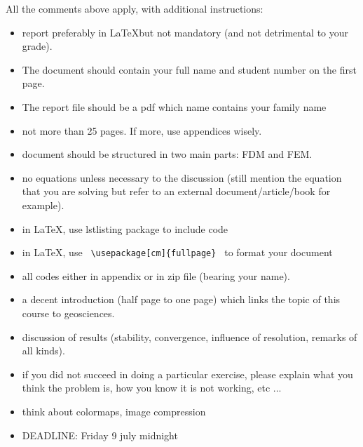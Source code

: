 All the comments above apply, with additional instructions:
\begin{itemize}
\item report preferably in \LaTeX but not mandatory (and not detrimental to your grade).
\item The document should contain your full name and student number on the first page. 
\item The report file should be a pdf which name contains your family name
\item not more than 25 pages. If more, use appendices wisely.
\item document should be structured in two main parts: FDM and FEM.
\item no equations unless necessary to the discussion (still mention the equation that 
you are solving but refer to an external document/article/book for example).
\item in \LaTeX, use lstlisting package to include code
\item in \LaTeX, use {\verb| \usepackage[cm]{fullpage} |} to format your document
\item all codes either in appendix or in zip file (bearing your name).
\item a decent introduction (half page to one page) which links the topic of this course to geosciences.
\item discussion of results (stability, convergence, influence of resolution, remarks of all kinds).
\item if you did not succeed in doing a particular exercise, please explain what you think the problem is, 
how you know it is not working, etc ...
\item think about colormaps, image compression
\item DEADLINE: Friday 9 july midnight 
\end{itemize}









